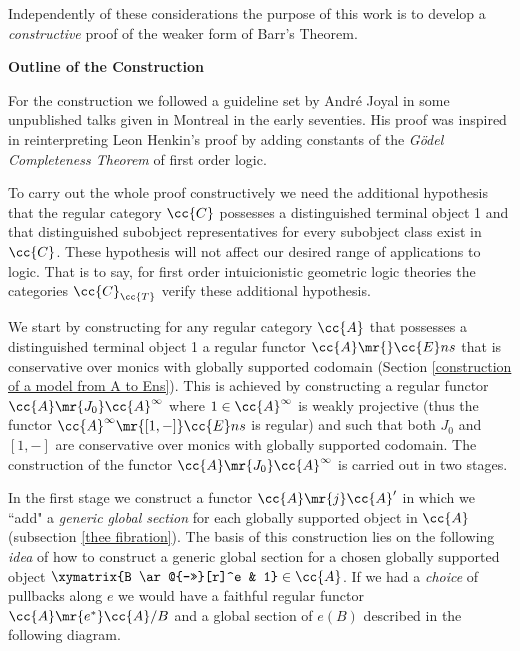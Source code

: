 Independently of these considerations the purpose of this work is to develop a \emph{constructive} proof of the weaker form of Barr's Theorem.

\vspace{1ex}

{\bf Outline of the Construction}

For the construction we followed a guideline set by Andr\'e Joyal in some unpublished talks given in Montreal in the early seventies. His proof was inspired in reinterpreting Leon Henkin's proof by adding constants of the \emph{G\"odel Completeness Theorem} of first order logic.

To carry out the whole proof constructively we need the additional hypothesis that the regular category $\cc{C}$ possesses a distinguished terminal object 1 and that  distinguished subobject representatives for every subobject class exist in $\cc{C}$. These hypothesis will not affect our desired range of applications to logic. That is to say, for first order intuicionistic geometric logic theories the categories $\cc{C}_{\cc{T}}$ verify these additional hypothesis.

We start by constructing for any regular category $\cc{A}$ that possesses a distinguished terminal object 1 a regular functor ${\cc{A} \mr{} \cc{E}ns}$ that is conservative over monics with globally supported codomain (Section \ref{construction of a model from A to Ens}). This is achieved by constructing a regular functor  ${\cc{A} \mr{J_0} \cc{A}^{\infty}}$  where $1 \in \cc{A}^{\infty}$ is weakly projective (thus the functor ${\cc{A}^{\infty} \mr{[1,-]} \cc{E}ns}$ is regular) and such that both $J_0$ and $[1,-]$ are conservative over monics with globally supported codomain. The construction of the functor ${\cc{A} \mr{J_0} \cc{A}^{\infty}}$ is carried out in two stages.

\vspace{1ex}

 In the first stage we construct a functor $\cc{A} \mr{j} \cc{A}'$ in which we ``add" a \emph{generic global section} for each globally supported object in $\cc{A}$ (subsection \ref{thee fibration}). The basis of this construction lies on the following \textit{idea} of how to construct a generic global section for a chosen globally supported object $\xymatrix{B \ar@{->>}[r]^e & 1} \in \cc{A}$. If we had a \emph{choice} of pullbacks along $e$ we would have a faithful regular functor $\cc{A} \mr{e^*} \cc{A}/B$ and a global section of $e(B)$ described in the following diagram.
 
